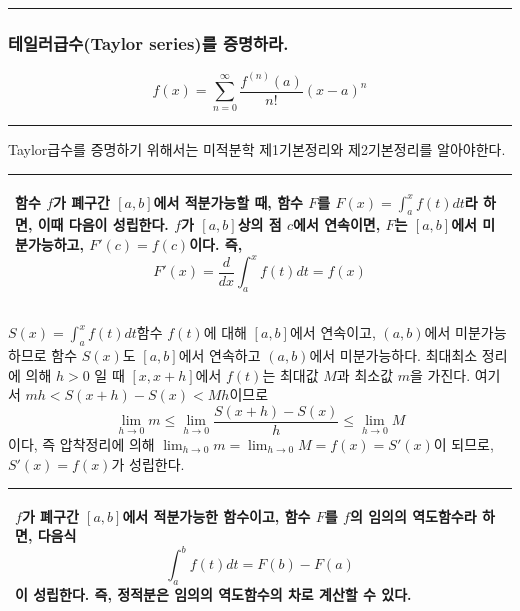 \rule{\textwidth}{0.1pt}

\subsubsection{테일러급수(Taylor series)를 증명하라.}
\begin{equation*}
f(x)=\sum_{n=0}^{\infty}\frac{f^{(n)}(a)}{n!}(x-a)^{n}
\end{equation*}
\rule{\textwidth}{0.1pt}
Taylor급수를 증명하기 위해서는 미적분학 제1기본정리와 제2기본정리를 알아야한다.\\
\begin{tabular}[c]{|p{\textwidth}|}
\hline
\begin{theorem}
함수 $f$가 폐구간 $[a,b]$에서 적분가능할 때, 함수 $F$를 $F(x)=\int_{a}^{x}f(t)dt$라 하면, 이때 다음이 성립한다.
$f$가 $[a,b]$상의 점 $c$에서 연속이면, $F$는 $[a,b]$에서 미분가능하고, $F'(c) = f(c)$이다. 즉,
\begin{equation}
F'(x)=\frac{d}{dx}\int_{a}^{x}f(t)dt=f(x)
\end{equation}
\end{theorem}
\\\hline
\end{tabular}

\begin{proof1}
$S(x)=\int_{a}^{x}f(t)dt$함수 $f(t)$에 대해 $[a,b]$에서 연속이고, $(a,b)$에서 미분가능하므로 함수 $S(x)$도 $[a,b]$에서 연속하고 $(a,b)$에서 미분가능하다.
최대최소 정리에 의해 $h>0$ 일 때 $[x, x+h]$에서 $f(t)$는 최대값 $M$과 최소값 $m$을 가진다.
여기서 $mh<S(x+h)-S(x)<Mh$이므로 
\begin{equation*}
\lim_{h\rightarrow0}m\leq\lim_{h\rightarrow0}\frac{S(x+h)-S(x)}{h}\leq\lim_{h\rightarrow0}M
\end{equation*}
이다, 즉 압착정리에 의해 $\lim_{h\rightarrow0}m=\lim_{h\rightarrow0}M=f(x)=S'(x)$이 되므로, $S'(x)=f(x)$가 성립한다.
\end{proof1}
\begin{tabular}[c]{|p{\textwidth}|}
\hline
\begin{theorem}
$f$가 폐구간 $[a,b]$에서 적분가능한 함수이고, 함수 $F$를 $f$의 임의의 역도함수라 하면, 다음식
\begin{equation}
\int_{a}^{b}f(t)dt=F(b)-F(a)
\end{equation}
이 성립한다. 즉, 정적분은 임의의 역도함수의 차로 계산할 수 있다.
\end{theorem}
\\\hline
\end{tabular}

